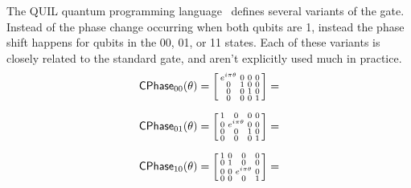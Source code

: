The QUIL quantum programming language~\cite{Smith2016a, ???} defines several variants of the  gate. Instead of the phase change occurring  when both qubits are 1, instead the phase shift happens for qubits in the 00, 01, or 11 states. Each of these variants is closely related to the standard  gate, and aren't explicitly used much in practice. 
$$
{\sf{CPhase}}_{00}(\theta) = 
\begin{bsmallmatrix}
 e^{i \pi \theta} & 0 & 0 & 0 \\
  0 & 1  & 0  & 0 \\
  0 & 0  & 1 & 0 \\
 0  & 0 & 0 &  1
\end{bsmallmatrix}
= 
$$

$$
{\sf{CPhase}}_{01}(\theta) = 
\begin{bsmallmatrix}
 1 & 0 & 0 & 0 \\
  0 & e^{i \pi \theta}  & 0  & 0 \\
  0 & 0  & 1 & 0 \\
 0  & 0 & 0 & 1
\end{bsmallmatrix}
= 
$$


$$
{\sf{CPhase}}_{10}(\theta) = 
\begin{bsmallmatrix}
 1 & 0 & 0 & 0 \\
  0 & 1  & 0  & 0 \\
  0 & 0  & e^{i \pi \theta} & 0 \\
 0  & 0 & 0 & 1
\end{bsmallmatrix}
= 
$$



